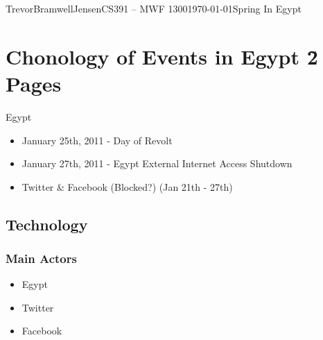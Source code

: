 \documentclass[12pt,letterpaper]{article}
\begin{document}
\begin{mla}{Trevor}{Bramwell}{Jensen}{CS391 -- MWF 1300}{\today}{Spring In Egypt}


\section{Chonology of Events in Egypt \~ 2 Pages}
    Egypt
    \begin{itemize}
        \item January 25th, 2011 - Day of Revolt
        \item January 27th, 2011 - Egypt External Internet Access Shutdown
        \item Twitter \& Facebook (Blocked?) (Jan 21th - 27th)
    \end{itemize}
    \subsection{Technology}
        \subsubsection{Main Actors}
        \begin{itemize}
            \item Egypt
            \item Twitter
            \item Facebook
        \end{itemize}

\end{mla}
\end{document}

